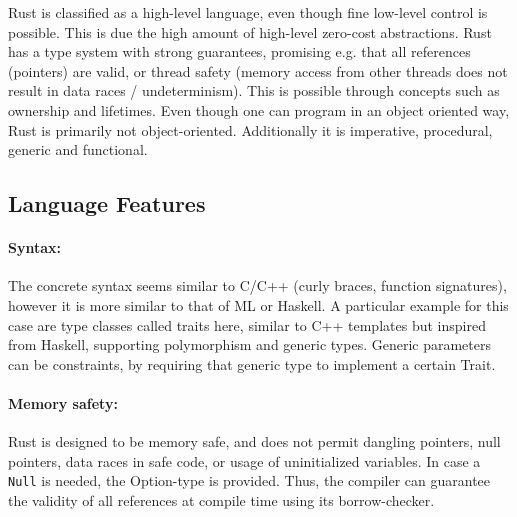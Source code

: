 Rust is classified as a high-level language, even though fine low-level control
is possible. This is due the high amount of high-level zero-cost abstractions.
Rust has a type system with strong guarantees, promising e.g. that all
references (pointers) are valid, or thread safety (memory access from other
threads does not result in data races / undeterminism). This is possible
through concepts such as ownership and lifetimes. Even though one can program
in an object oriented way, Rust is primarily not object-oriented. Additionally
it is imperative, procedural, generic and functional.

\subsection{Language Features}\label{sec:RustFeatures}

\paragraph{Syntax:}\label{sec:syntax}
The concrete syntax seems similar to C/C++ (curly braces, function signatures),
however it is more similar to that of ML or Haskell. A particular example for
this case are type classes called traits here, similar to C++ templates but
inspired from Haskell, supporting polymorphism and generic types. Generic
parameters can be constraints, by requiring that generic type to implement a
certain Trait.

\paragraph{Memory safety:}\label{sec:memsafe}
Rust is designed to be memory safe, and does not permit dangling pointers, null
pointers, data races in safe code, or usage of uninitialized variables. In case
a \verb|Null| is needed, the Option-type is provided. Thus, the compiler can
guarantee the validity of all references at compile time using its
borrow-checker.


